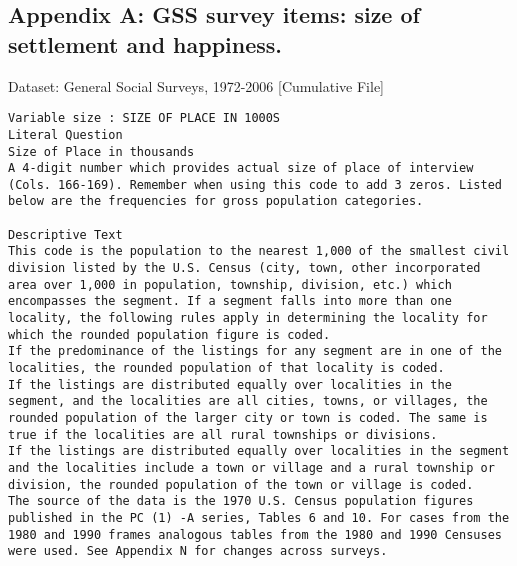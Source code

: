 \documentclass[12pt, letterpaper]{article}
\begin{document}
\begin{spacing}{1.9}
\section*{Appendix A: GSS survey items: size of settlement and
happiness.}
\label{app_a}

Dataset: General Social Surveys, 1972-2006 [Cumulative File]

{\scriptsize
\begin{verbatim}
Variable size : SIZE OF PLACE IN 1000S
Literal Question
Size of Place in thousands
A 4-digit number which provides actual size of place of interview
(Cols. 166-169). Remember when using this code to add 3 zeros. Listed
below are the frequencies for gross population categories.

Descriptive Text
This code is the population to the nearest 1,000 of the smallest civil
division listed by the U.S. Census (city, town, other incorporated
area over 1,000 in population, township, division, etc.) which
encompasses the segment. If a segment falls into more than one
locality, the following rules apply in determining the locality for
which the rounded population figure is coded.
If the predominance of the listings for any segment are in one of the
localities, the rounded population of that locality is coded.
If the listings are distributed equally over localities in the
segment, and the localities are all cities, towns, or villages, the
rounded population of the larger city or town is coded. The same is
true if the localities are all rural townships or divisions.
If the listings are distributed equally over localities in the segment
and the localities include a town or village and a rural township or
division, the rounded population of the town or village is coded.
The source of the data is the 1970 U.S. Census population figures
published in the PC (1) -A series, Tables 6 and 10. For cases from the
1980 and 1990 frames analogous tables from the 1980 and 1990 Censuses
were used. See Appendix N for changes across surveys.

\end{verbatim}

}
\end{spacing}
\end{document}
